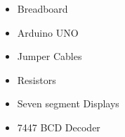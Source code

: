\begin{itemize}
    \item Breadboard
    \item Arduino UNO
    \item Jumper Cables
    \item Resistors
    \item Seven segment Displays
    \item 7447 BCD Decoder
\end{itemize}